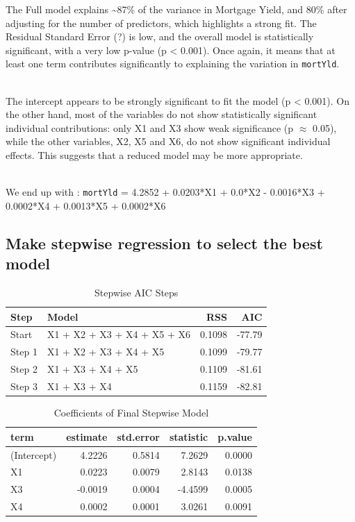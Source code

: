 \documentclass[
  11pt,
]{article}
\begin{document}
The Full model explains \textasciitilde87\% of the variance in Mortgage
Yield, and 80\% after adjusting for the number of predictors, which
highlights a strong fit. The Residual Standard Error (?) is low, and the
overall model is statistically significant, with a very low p-value (p
\textless{} 0.001). Once again, it means that at least one term
contributes significantly to explaining the variation in
\texttt{mortYld}.\\
\strut \\
The intercept appears to be strongly significant to fit the model (p
\textless{} 0.001). On the other hand, most of the variables do not show
statistically significant individual contributions: only X1 and X3 show
weak significance (p \(\approx\) 0.05), while the other variables, X2,
X5 and X6, do not show significant individual effects. This suggests
that a reduced model may be more appropriate.\\
\strut \\
We end up with : \texttt{mortYld} = 4.2852 + 0.0203*X1 + 0.0*X2 -
0.0016*X3 + 0.0002*X4 + 0.0013*X5 + 0.0002*X6

\subsection{Make stepwise regression to select the best
model}\label{make-stepwise-regression-to-select-the-best-model}

\begin{table}[!h]
\centering
\caption{\label{tab:unnamed-chunk-12}Stepwise AIC Steps}
\centering
\fontsize{8}{10}\selectfont
\begin{tabular}[t]{llrr}
\toprule
Step & Model & RSS & AIC\\
\midrule
Start & X1 + X2 + X3 + X4 + X5 + X6 & 0.1098 & -77.79\\
Step 1 & X1 + X2 + X3 + X4 + X5 & 0.1099 & -79.77\\
Step 2 & X1 + X3 + X4 + X5 & 0.1109 & -81.61\\
Step 3 & X1 + X3 + X4 & 0.1159 & -82.81\\
\bottomrule
\end{tabular}
\end{table}

\begin{table}[!h]
\centering
\caption{\label{tab:unnamed-chunk-13}Coefficients of Final Stepwise Model}
\centering
\fontsize{8}{10}\selectfont
\begin{tabular}[t]{lrrrr}
\toprule
term & estimate & std.error & statistic & p.value\\
\midrule
(Intercept) & 4.2226 & 0.5814 & 7.2629 & 0.0000\\
X1 & 0.0223 & 0.0079 & 2.8143 & 0.0138\\
X3 & -0.0019 & 0.0004 & -4.4599 & 0.0005\\
X4 & 0.0002 & 0.0001 & 3.0261 & 0.0091\\
\bottomrule
\end{tabular}
\end{table}
\end{document}
